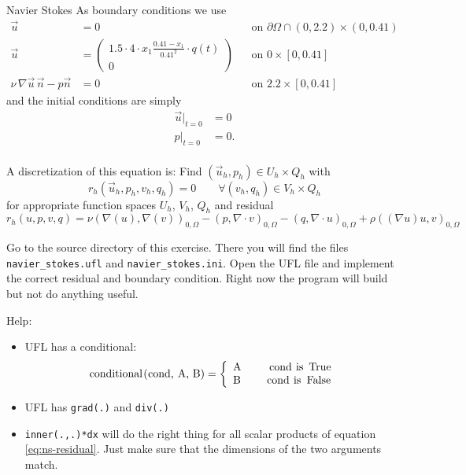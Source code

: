 \documentclass[12pt,a4paper]{article}
\begin{document}
\begin{Exercise}{Navier Stokes}
  As boundary conditions we use
  \begin{align*}
    \vec{u} &= 0 && \text{on $\partial\Omega \cap (0,2.2)\times(0,0.41)$} \\
    \vec{u} &=
    \begin{pmatrix}
      1.5 \cdot 4 \cdot x_1 \frac{0.41-x_1}{0.41^2} \cdot q(t) \\ 0
    \end{pmatrix} && \text{on $0\times[0,0.41]$}\\
    \nu \, \nabla \vec{u} \, \vec{n} - p\vec{n} &= 0 && \text{on $2.2\times[0,0.41]$}
  \end{align*}
  and the initial conditions are simply
  \begin{align*}
    \vec{u}|_{t=0} &= 0 \\
    p|_{t=0} &= 0. \\
  \end{align*}

  A discretization of this equation is: Find
  $(\vec{u}_h,p_h) \in U_h\times Q_h$ with
  \begin{equation*}
    r_h(\vec{u}_h, p_h, v_h, q_h) = 0 \qquad \forall (v_h,q_h) \in V_h\times Q_h
  \end{equation*}
  for appropriate function spaces $U_h$, $V_h$, $Q_h$ and residual
  \begin{equation}
    r_h(u,p,v,q)
    = \nu (\nabla(u), \nabla(v))_{0,\Omega}
    - (p, \nabla \cdot v)_{0,\Omega}
    - (q, \nabla \cdot u)_{0, \Omega}
    + \rho ((\nabla u) u, v)_{0, \Omega}
    \label{eq:ns-residual}
  \end{equation}

  Go to the source directory of this exercise. There you will find the files
  \lstinline{navier_stokes.ufl} and \lstinline{navier_stokes.ini}. Open the UFL
  file and implement the correct residual and boundary condition. Right now the
  program will build but not do anything useful.

  Help:
  \begin{itemize}
  \item UFL has a conditional:
    \begin{displaymath}
      \text{\lstinline{conditional(cond, A, B)}} = \left\{
        \begin{array}{lr}
          \text{\lstinline{A}}\ \ \ \ & \text{\lstinline{cond is True}} \\
          \text{\lstinline{B}} & \text{\lstinline{cond is False}}
        \end{array}
      \right.
    \end{displaymath}
  \item UFL has \lstinline{grad(.)} and \lstinline{div(.)}
  \item \lstinline{inner(.,.)*dx} will do the right thing for all scalar
    products of equation \eqref{eq:ns-residual}. Just make sure that the
    dimensions of the two arguments match.
  \end{itemize}
\end{Exercise}
\end{document}
